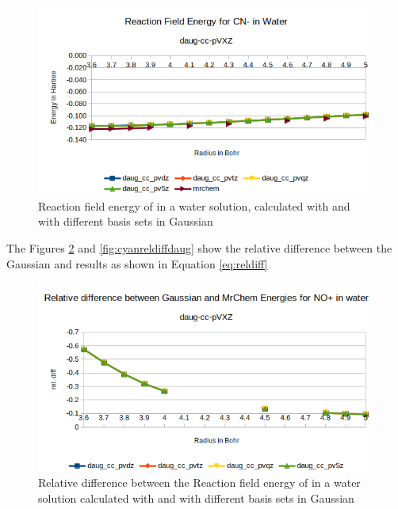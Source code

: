 \documentclass[../master_thesis.tex]{subfiles}
\begin{document}
\begin{figure}[h!]
  \centering
    \includegraphics[width=\linewidth]{img/Erdaugcyan.png}
  \caption{Reaction field energy of  in a water solution, calculated with \mrchem
  and with different basis sets in Gaussian}
  \label{fig:cyanEnergyplotsdaug}
\end{figure}

The Figures \ref{fig:nopreldiffdaug} and \ref{fig:cyanreldiffdaug} show the relative
difference between the Gaussian and \mrchem results as shown in Equation \ref{eq:reldiff}

\begin{figure}[h!]
  \centering
    \includegraphics[width=\linewidth]{img/nopdaugreldiff.png}
    \caption{Relative difference between the Reaction field energy of  in a water solution calculated with \mrchem
  and with different basis sets in Gaussian}
  \label{fig:nopreldiffdaug}
\end{figure}
\end{document}
